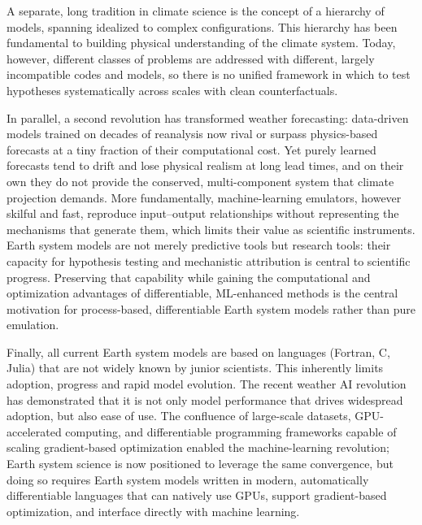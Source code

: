\documentclass[11pt]{article}
\begin{document}
A separate, long tradition in climate science is the concept of a hierarchy of models, spanning
idealized to complex configurations\cite{Held2005,Jeevanjee2017,Maher2019}. This hierarchy has been
fundamental to building physical understanding of the climate system. Today, however, different
classes of problems are addressed with different, largely incompatible codes and models, so there is
no unified framework in which to test hypotheses systematically across scales with clean
counterfactuals.

In parallel, a second revolution has transformed weather forecasting: data-driven models trained on
decades of reanalysis now rival or surpass physics-based forecasts at a tiny fraction of their
computational cost\cite{Pathak2022,Bi2023,Lam2023}. Yet purely learned forecasts tend to drift and
lose physical realism at long lead times\cite{Lehmann2026}, and on their own they do not provide the
conserved, multi-component system that climate projection demands. More fundamentally,
machine-learning emulators, however skilful and fast, reproduce input--output relationships without
representing the mechanisms that generate them, which limits their value as scientific instruments.
Earth system models are not merely predictive tools but research tools: their capacity for hypothesis
testing and mechanistic attribution is central to scientific progress. Preserving that capability
while gaining the computational and optimization advantages of differentiable, ML-enhanced methods is
the central motivation for process-based, differentiable Earth system models rather than pure
emulation.

Finally, all current Earth system models are based on languages (Fortran, C, Julia) that are not
widely known by junior scientists. This inherently limits adoption, progress and rapid model
evolution. The recent weather AI revolution has demonstrated that it is not only model performance
that drives widespread adoption, but also ease of use. The confluence of large-scale datasets,
GPU-accelerated computing, and differentiable programming frameworks capable of scaling
gradient-based optimization enabled the machine-learning revolution; Earth system science is now
positioned to leverage the same convergence, but doing so requires Earth system models written in
modern, automatically differentiable languages that can natively use GPUs, support gradient-based
optimization, and interface directly with machine learning.
\end{document}
